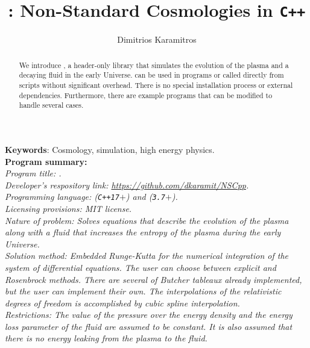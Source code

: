 \documentclass[11pt,a4paper]{article}
\author[ ]{Dimitrios Karamitros}
\affil[ ]{\em Department of Physics and Astronomy, The University of Manchester,}
\affil[ ]{\em Manchester M13 9PL, United Kingdom}
\affil[ ]{}
\affil[ ]{\textit{E-mail: } \href{mailto:dimitrios.karamitros@manchester.ac.uk}{\color{blue}{dimitrios.karamitros@manchester.ac.uk}}}
\title{\nsc: Non-Standard Cosmologies in {\tt C++}}
\begin{document}
\maketitle


\begin{abstract}
We introduce \nsc, a header-only \CPP library that simulates the evolution of the plasma and a decaying fluid in the early Universe.
%
\nsc can be used in \CPP programs or called directly from \PY scripts without significant overhead.
%
There is no special installation process or external dependencies. Furthermore, there are example programs that can be modified to handle several cases.\\ 
\end{abstract}

\noindent
{{\bf Keywords}: Cosmology, simulation, high energy physics.}\\

\noindent
{\bf Program summary:}\\

{\sl 
	Program title: \nsc.\\
	
	Developer's respository link: \href{https://github.com/dkaramit/NSCpp}{https://github.com/dkaramit/NSCpp}.\\
	
	Programming language: \CPP ({\tt C++17}$+$) and \PY ({\tt 3.7}$+$).\\
	
	Licensing provisions: MIT license.\\
	
	Nature of problem: Solves equations that describe the evolution of the plasma along with a fluid that increases the entropy of the plasma during the early Universe.\\
	
	Solution method: Embedded Runge-Kutta for the numerical integration of the system of differential equations. The user can choose between explicit and Rosenbrock methods. There are several of Butcher tableaux already implemented, but the user can implement their own. The interpolations of the relativistic degrees of freedom is accomplished by cubic spline interpolation.\\ 
	
	Restrictions: The value of the pressure over the energy density and the energy loss parameter of the fluid are assumed to be constant. It is also assumed that there is no energy leaking from the plasma to the fluid.
}
\end{document}
